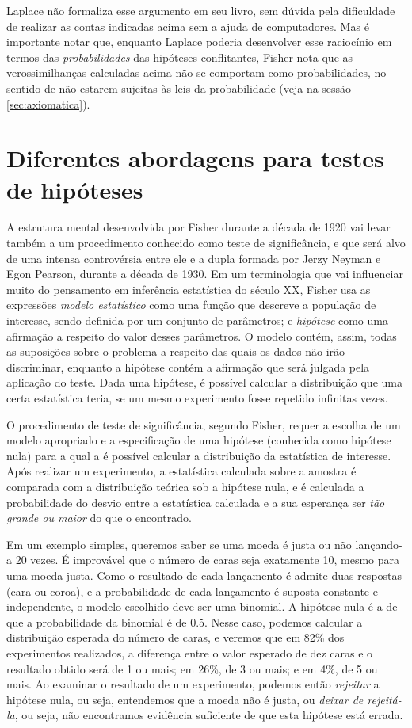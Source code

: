 Laplace não formaliza esse argumento em seu livro, sem dúvida pela dificuldade de realizar as contas indicadas acima sem
a ajuda de computadores. Mas é importante notar que, enquanto Laplace poderia desenvolver esse raciocínio em termos das 
{\em probabilidades} das hipóteses conflitantes, Fisher nota que as verossimilhanças calculadas acima não se comportam como 
probabilidades, no sentido de não estarem sujeitas às leis da probabilidade (veja na sessão \ref{sec:axiomatica}).

\section{Diferentes abordagens para testes de hipóteses}

A estrutura mental desenvolvida por Fisher durante a década de 1920 vai levar também a um procedimento conhecido como teste de 
significância, e que será alvo de uma intensa controvérsia entre ele e a dupla formada por Jerzy Neyman e Egon Pearson, 
durante a década de 1930. Em um terminologia que vai influenciar muito do pensamento em inferência estatística do século XX,
Fisher usa as expressões {\em modelo estatístico} como uma função que descreve a população de interesse, sendo definida 
por um conjunto de parâmetros; e {\em hipótese} como uma afirmação a respeito do valor desses parâmetros. O modelo contém, 
assim, todas as suposições sobre o problema a respeito das quais os dados não irão discriminar, enquanto a hipótese
contém a afirmação que será julgada pela aplicação do teste. Dada uma hipótese, é possível
calcular a distribuição que uma certa estatística teria, se um mesmo experimento fosse repetido infinitas vezes.

O procedimento de teste de significância, segundo Fisher, requer a escolha de um modelo apropriado e a especificação de uma 
hipótese (conhecida como hipótese nula) para a qual a é possível calcular a distribuição da estatística de interesse. 
Após realizar um experimento, a estatística calculada sobre a amostra é comparada com a distribuição teórica sob a hipótese nula,
e é calculada a probabilidade do desvio entre a estatística calculada e a sua esperança ser {\em tão grande ou maior} do que o
encontrado. 

Em um exemplo simples, queremos saber se uma moeda é justa ou não lançando-a 20 vezes. É improvável que o número de caras seja
exatamente 10, mesmo para uma moeda justa. Como o resultado de cada lançamento é
admite duas	respostas (cara ou coroa), e a probabilidade de cada lançamento é suposta constante e independente, o modelo escolhido
deve ser uma binomial. A hipótese nula é a de que a probabilidade da binomial é de 0.5. Nesse caso, podemos calcular a 
distribuição esperada do número de caras, e veremos que em 82\% dos experimentos realizados, a diferença entre o valor esperado
de dez caras e o resultado obtido será de 1 ou mais; em 26\%, de 3 ou mais; e em 4\%, de 5 ou mais. Ao examinar o resultado 
de um experimento, podemos então {\em rejeitar} a hipótese nula, ou seja, entendemos que a moeda não é justa, ou {\em deixar
de rejeitá-la}, ou seja, não encontramos evidência suficiente de que esta hipótese está errada.


